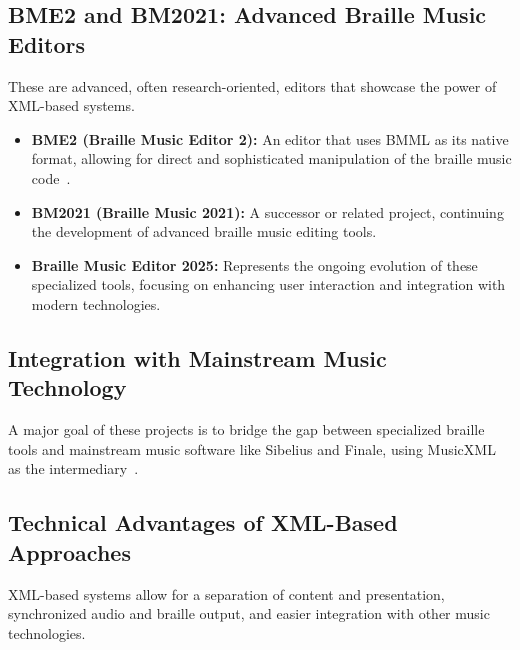 \subsection{BME2 and BM2021: Advanced Braille Music Editors}\label{ch10:ssec:bme2-bm2021}
These are advanced, often research-oriented, editors that showcase the power of \gls{XML}-based systems.
\begin{itemize}
	\item \textbf{BME2 (Braille Music Editor 2):} An editor that uses \gls{BMML} as its native format, allowing for direct and sophisticated manipulation of the braille music code~\supercite{braillemusiceditor}.
	\item \textbf{BM2021 (Braille Music 2021):} A successor or related project, continuing the development of advanced braille music editing tools.
	\item \textbf{Braille Music Editor 2025:} Represents the ongoing evolution of these specialized tools, focusing on enhancing user interaction and integration with modern technologies.
\end{itemize}

\subsection{Integration with Mainstream Music Technology}\label{ch10:ssec:bmml-integration}
A major goal of these projects is to bridge the gap between specialized braille tools and mainstream music software like Sibelius and Finale, using \gls{MusicXML} as the intermediary~\supercite{daisy-musicxml}.

\subsection{Technical Advantages of XML-Based Approaches}\label{ch10:ssec:xml-advantages}
\gls{XML}-based systems allow for a separation of content and presentation, synchronized audio and braille output, and easier integration with other music technologies.

